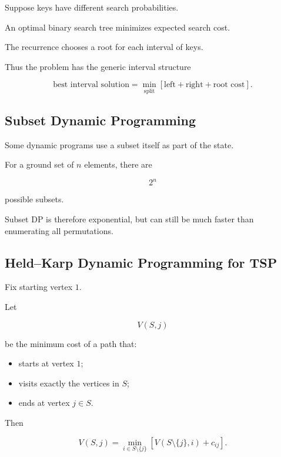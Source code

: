 Suppose keys have different search probabilities.

An optimal binary search tree minimizes expected search cost.

The recurrence chooses a root for each interval of keys.

Thus the problem has the generic interval structure

\[
\boxed{
\text{best interval solution}
=
\min_{\text{split}}
[
\text{left}
+
\text{right}
+
\text{root cost}
].
}
\]

\subsection{Subset Dynamic Programming}
\label{subsec:subset-dynamic-programming}

Some dynamic programs use a subset itself as part of the state.

For a ground set of \(n\) elements, there are

\[
\boxed{
2^n
}
\]

possible subsets.

Subset DP is therefore exponential, but can still be much faster than
enumerating all permutations.

\subsection{Held--Karp Dynamic Programming for TSP}
\label{subsec:held-karp-tsp}

Fix starting vertex \(1\).

Let

\[
V(S,j)
\]

be the minimum cost of a path that:

\begin{itemize}
    \item starts at vertex \(1\);
    \item visits exactly the vertices in \(S\);
    \item ends at vertex \(j\in S\).
\end{itemize}

Then

\[
\boxed{
V(S,j)
=
\min_{i\in S\setminus\{j\}}
\left[
V(S\setminus\{j\},i)
+
c_{ij}
\right].
}
\]

